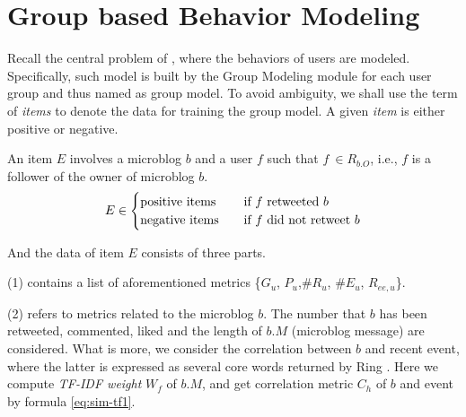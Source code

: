 \section{Group based Behavior Modeling}
\label{sec:gm}



Recall the central problem of \sys{}, where the \retg{} behaviors of users are modeled.
Specifically, such model is built by the Group Modeling module for each user group and thus named as group model.
To avoid ambiguity, we shall use the term of \textit{items} to denote the data for training the group model.
A given \textit{item} is either positive or negative.

\begin{definition}
\label{def:gm-it}
An item $E$ involves a microblog $b$ and a user $f$ such that $f\ \in R_{b.O}$, i.e., $f$ is a follower of  the owner of microblog $b$.
\begin{equation}
\label{eq:gm-it}
E \in
  \begin{cases}
    \text{positive items}       & \quad \text{if } f \text{ retweeted{} } b\\
    \text{negative items}  		& \quad \text{if } f \text{ did not retweet{} } b
  \end{cases}
\end{equation}
\end{definition}

And the data of item $E$ consists of three parts.

	\stab(1)  contains a list of aforementioned metrics \{$G_u$, $P_u$,\#$R_u$, \#$E_u$, $R_{ee,u}$\}.
	

\stab(2)  refers to metrics related to the microblog $b$.
The number that $b$ has been retweeted, commented, liked and the length of $b.M$ (microblog message) are considered.
What is more, we consider the correlation between $b$ and recent event, where the latter is expressed as several core words returned by Ring \cite{IEEEexample:ring}.
Here we compute \textit{TF-IDF weight} $W_f$ of $b.M$, and get correlation metric $C_h$ of $b$ and event by formula \ref{eq:sim-tf1}.

